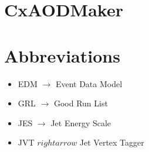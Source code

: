 \documentclass[idxtotoc,hyperref,openany]{labbook} %
\begin{document}
\section{CxAODMaker} 



\section{Abbreviations}
\begin{itemize} 
\item EDM $\rightarrow$ Event Data Model 
\item GRL $\rightarrow$ Good Run List 
\item JES $\rightarrow$ Jet Energy Scale
\item JVT $rightarrow$  Jet Vertex Tagger
\end{itemize}
 

  
\end{document}
